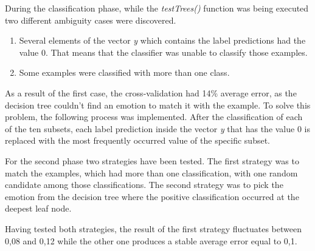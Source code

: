 During the classification phase, while the \emph{testTrees()} function was
being executed two different ambiguity cases were discovered. 

\begin{enumerate}
\item Several elements of the vector \emph{y} which contains the label
predictions had the value 0. That means that the classifier was unable to
classify those examples.
\item Some examples were classified with more than one class.
\end{enumerate}

As a result of the first case, the cross-validation had 14\% average error, as
the decision tree couldn't find an emotion to match it with the example. To
solve this problem, the following process was implemented. After the
classification of each of the ten subsets, each label prediction inside the
vector \emph{y} that has the value 0 is replaced with the most frequently occurred value of the specific subset.

For the second phase two strategies have been tested. The first strategy was to
match the examples, which had more than one classification, with one random
candidate among those classifications. The second strategy was to pick the
emotion from the decision tree where the positive classification occurred at
the deepest leaf node.

Having tested both strategies, the result of the first
strategy fluctuates between 0,08 and 0,12 while the other one produces a stable
average error equal to 0,1.
